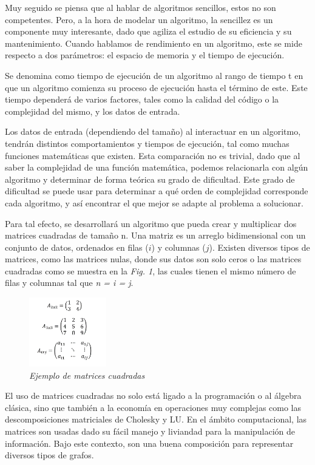 \documentclass[11pt, twocolumn]{llncs}
\begin{document}
Muy seguido se piensa que al hablar de algoritmos sencillos, estos no son competentes. Pero, a la hora de modelar un algoritmo, la sencillez es un componente muy interesante, dado que agiliza el estudio de su eficiencia y su mantenimiento. Cuando hablamos de rendimiento en un algoritmo, este se mide respecto a dos parámetros: el espacio de memoria y el tiempo de ejecución.

Se denomina como tiempo de ejecución de un algoritmo al rango de tiempo t en que un algoritmo comienza su proceso de ejecución hasta el término de este. Este tiempo dependerá de varios factores, tales como la calidad del código o la complejidad del mismo, y los datos de entrada.

Los datos de entrada (dependiendo del tamaño) al interactuar en un algoritmo, tendrán distintos comportamientos y tiempos de ejecución, tal como muchas funciones matemáticas que existen. Esta comparación no es trivial, dado que al saber la complejidad de una función matemática, podemos relacionarla con algún algoritmo y determinar de forma teórica su grado de dificultad. Este grado de dificultad se puede usar para determinar a qué orden de complejidad corresponde cada algoritmo, y así encontrar el que mejor se adapte al problema a solucionar.

Para tal efecto, se desarrollará un algoritmo que pueda crear y multiplicar dos matrices cuadradas de tamaño n. Una matriz es un arreglo bidimensional con un conjunto de datos, ordenados en filas ($i$) y columnas ($j$). Existen diversos tipos de matrices, como las matrices nulas, donde sus datos son solo ceros o las matrices cuadradas como se muestra en la \textit{Fig. 1}, las cuales tienen el mismo número de filas y columnas tal que \textit{n = i = j}.

\begin{figure}
\caption{\textit{\label{fig:matrices}Ejemplo de matrices cuadradas}}
\centering
\includegraphics[width=0.3\textwidth]{imagenes/matrices.png}
\end{figure}

El uso de matrices cuadradas no solo está ligado a la programación o al álgebra clásica, sino que también a la economía en operaciones muy complejas como las descomposiciones matriciales de Cholesky y LU. En el ámbito computacional, las matrices son usadas dado su fácil manejo y liviandad para la manipulación de información. Bajo este contexto, son una buena composición para representar diversos tipos de grafos.
\end{document}
